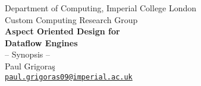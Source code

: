 \begin{titlepage}

  \begin{center}

    {\Large Department of Computing, Imperial College London}
    \HRule \\[0.5cm]
    {\Large Custom Computing Research Group} \\[2cm]

    {\huge \bfseries Aspect Oriented Design for \\[0.25cm]Dataflow Engines}\\[0.5cm]
    {\Large -- Synopsis -- } \\[1.5cm]

    {\Large Paul Grigora\c{s}} \\[0.5cm]
    {\href{mailto:paul.grigoras09@imperial.ac.uk}{\texttt{\large paul.grigoras09@imperial.ac.uk}}}\\[1.5cm]

    \begin{figure}[!ht]
      \centering
      \def\svgwidth{0.6\linewidth}
      
    \end{figure}
  \end{center}

\end{titlepage}
